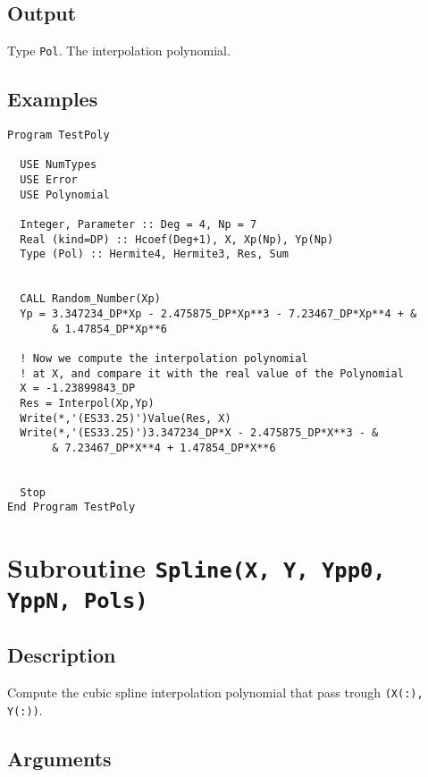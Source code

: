 \subsection{Output}

Type \texttt{Pol}. The interpolation polynomial.

\subsection{Examples}

\begin{lstlisting}[emph=Interpol,
                   emphstyle=\color{blue},
                   frame=trBL,
                   caption=Computes the interpolation polynomial.,
                   label=interpol]
Program TestPoly

  USE NumTypes
  USE Error
  USE Polynomial

  Integer, Parameter :: Deg = 4, Np = 7
  Real (kind=DP) :: Hcoef(Deg+1), X, Xp(Np), Yp(Np)
  Type (Pol) :: Hermite4, Hermite3, Res, Sum


  CALL Random_Number(Xp)
  Yp = 3.347234_DP*Xp - 2.475875_DP*Xp**3 - 7.23467_DP*Xp**4 + &
       & 1.47854_DP*Xp**6

  ! Now we compute the interpolation polynomial
  ! at X, and compare it with the real value of the Polynomial
  X = -1.23899843_DP
  Res = Interpol(Xp,Yp)
  Write(*,'(ES33.25)')Value(Res, X)
  Write(*,'(ES33.25)')3.347234_DP*X - 2.475875_DP*X**3 - &
       & 7.23467_DP*X**4 + 1.47854_DP*X**6


  Stop
End Program TestPoly
\end{lstlisting}

\section{Subroutine \texttt{Spline(X, Y, Ypp0, YppN, Pols)}}

\subsection{Description}

Compute the cubic spline interpolation polynomial that pass trough
\texttt{(X(:), Y(:))}.

\subsection{Arguments}

